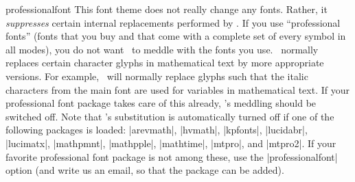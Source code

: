 \begin{fontthemeexample*}{professionalfont}
  This font theme does not really change any fonts. Rather, it \emph{suppresses} certain internal replacements performed by \beamer. If you use ``professional fonts'' (fonts that you buy and that come with a complete set of every symbol in all modes), you do not want \beamer\ to meddle with the fonts you use. \beamer\ normally replaces certain character glyphs in mathematical text by more appropriate versions. For example, \beamer\ will normally replace glyphs such that the italic characters from the main font are used for variables in mathematical text. If your professional font package takes care of this already, \beamer's meddling should be switched off. Note that \beamer's substitution is automatically turned off if one of the following packages is loaded: |arevmath|, |hvmath|, |kpfonts|, |lucidabr|, |lucimatx|, |mathpmnt|, |mathpple|, |mathtime|, |mtpro|, and |mtpro2|. If your favorite professional font package is not among these, use the |professionalfont| option (and write us an email, so that the package can be added).
\end{fontthemeexample*}

